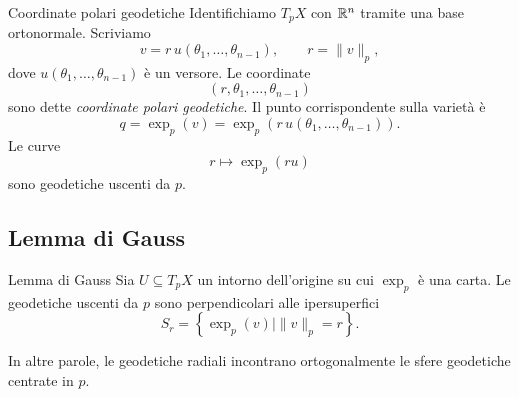 \documentclass[a4paper]{article}
\begin{document}
\begin{snippetdefinition}{Coordinate polari geodetiche}
Identifichiamo \(T_pX\) con \(\mathbb{R}^n\) tramite una base ortonormale. Scriviamo
\[
    v=r\,u(\theta_1,\ldots,\theta_{n-1}),
    \qquad
    r=\|v\|_p,
\]
dove \(u(\theta_1,\ldots,\theta_{n-1})\) è un versore. Le coordinate
\[
    (r,\theta_1,\ldots,\theta_{n-1})
\]
sono dette \emph{coordinate polari geodetiche}. Il punto corrispondente sulla varietà è
\[
    q=\exp_p(v)=\exp_p\left(r\,u(\theta_1,\ldots,\theta_{n-1})\right).
\]
Le curve
\[
    r\longmapsto \exp_p(r u)
\]
sono geodetiche uscenti da \(p\).
\end{snippetdefinition}

\subsection{Lemma di Gauss}

\begin{snippettheorem}{Lemma di Gauss}
Sia \(U\subseteq T_pX\) un intorno dell'origine su cui \(\exp_p\) è una carta. Le geodetiche uscenti da \(p\) sono perpendicolari alle ipersuperfici
\[
    S_r=\left\{\exp_p(v) \mid \|v\|_p=r\right\}.
\]
\end{snippettheorem}

In altre parole, le geodetiche radiali incontrano ortogonalmente le sfere geodetiche centrate in \(p\).
\end{document}
